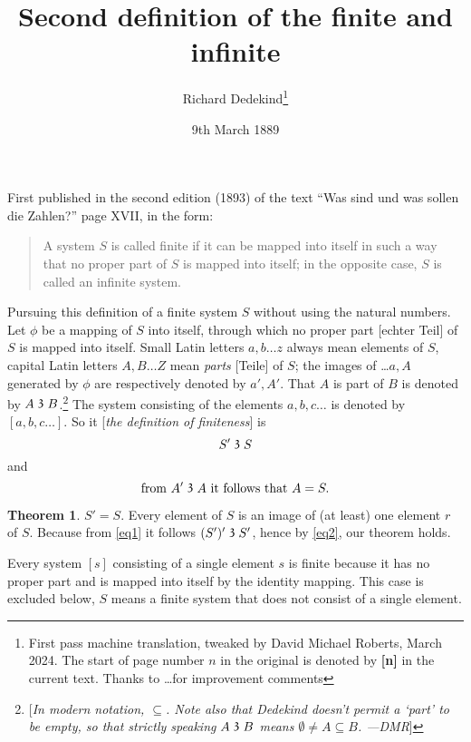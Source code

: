 \documentclass[leqno, hidelinks]{article}
\theoremstyle{definition}
\newtheorem{theorem}{Theorem}
\newcommand\partof{\mathrel{\raisebox{0.45ex}{$\mathfrak{3}$}}}
\begin{document}
\title{Second definition of the finite and infinite}
\author{Richard Dedekind\thanks{First pass machine translation, tweaked by David Michael Roberts, March 2024. The start of page number $n$ in the original is denoted by \textbf{[n]} in the current text. Thanks to \ldots for improvement comments}}
\date{9th March 1889}
\maketitle

First published in the second edition (1893) of the text ``Was sind und was sollen die Zahlen?'' page XVII, in the form:

\begin{quote}
A system $S$ is called finite if it can be mapped into itself in such a way that no proper part of $S$ is mapped into itself; in the opposite case, $S$ is called an infinite system.
\end{quote}

Pursuing this definition of a finite system $S$ without using the natural numbers.
Let $\phi$ be a mapping of $S$ into itself, through which no proper part [echter Teil] of $S$ is mapped into itself.
Small Latin letters $a, b \ldots z$ always mean elements of $S$, capital Latin letters $A, B \ldots Z$ mean \emph{parts} [Teile] of $S$; the images of \ldots $a, A$ generated by $\phi$ are respectively denoted by $a', A'$.
That $A$ is part of $B$ is denoted by $A \partof B$.\footnote{[\emph{In modern notation, $\subseteq$. Note also that Dedekind doesn't permit a `part' to be empty, so that strictly speaking $A\partof B$ means $\emptyset \neq A \subseteq B$. ---DMR}]} The system consisting of the elements $a, b, c \ldots $ is denoted by $[a, b, c \ldots]$.
So it [\emph{the definition of finiteness}] is
\begin{equation}\label{eq1}
				S' \partof S
\end{equation}
and
\begin{equation}\label{eq2}
		\text{from } A' \partof A \text{ it follows that } A = S.
\end{equation}

\begin{theorem}\label{thm1}
$S' = S$. Every element of $S$ is an image of (at least) one element $r$ of $S$. Because from \eqref{eq1} it follows $(S')' \partof S'$, hence by \eqref{eq2}, our theorem holds.
\end{theorem}

Every system $[s]$ consisting of a single element $s$ is finite because it has no proper part and is mapped into itself by the identity mapping.
This case is excluded below, $S$ means a finite system that does not consist of a single element.
\end{document}
